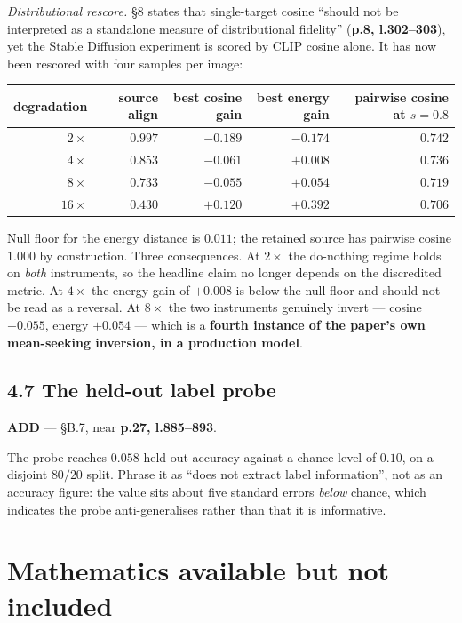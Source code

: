 \documentclass[11pt]{article}
\newcommand{\ADD}{\textcolor{add}{\textbf{ADD}}}
\newcommand{\pl}[2]{\textbf{p.#1, l.#2}}
\begin{document}
\emph{Distributional rescore.} \S8 states that single-target cosine ``should not be interpreted
as a standalone measure of distributional fidelity'' (\pl{8}{302--303}), yet the Stable Diffusion
experiment is scored by CLIP cosine alone. It has now been rescored with four samples per image:

\begin{center}
\small
\begin{tabular}{@{}rrrrr@{}}
\toprule
degradation & source align & best cosine gain & best energy gain & pairwise cosine at $s=0.8$\\
\midrule
$2\times$  & $0.997$ & $-0.189$ & $-0.174$ & $0.742$\\
$4\times$  & $0.853$ & $-0.061$ & $+0.008$ & $0.736$\\
$8\times$  & $0.733$ & $-0.055$ & $+0.054$ & $0.719$\\
$16\times$ & $0.430$ & $+0.120$ & $+0.392$ & $0.706$\\
\bottomrule
\end{tabular}
\end{center}

Null floor for the energy distance is $0.011$; the retained source has pairwise cosine $1.000$ by
construction. Three consequences. At $2\times$ the do-nothing regime holds on \emph{both}
instruments, so the headline claim no longer depends on the discredited metric. At $4\times$ the
energy gain of $+0.008$ is below the null floor and should not be read as a reversal. At
$8\times$ the two instruments genuinely invert --- cosine $-0.055$, energy $+0.054$ --- which is
a \textbf{fourth instance of the paper's own mean-seeking inversion, in a production model}.

\subsection*{4.7 The held-out label probe}

\ADD{} --- \S B.7, near \pl{27}{885--893}.

The probe reaches $0.058$ held-out accuracy against a chance level of $0.10$, on a disjoint
$80/20$ split. Phrase it as ``does not extract label information'', not as an accuracy figure:
the value sits about five standard errors \emph{below} chance, which indicates the probe
anti-generalises rather than that it is informative.

\section{Mathematics available but not included}
\end{document}
